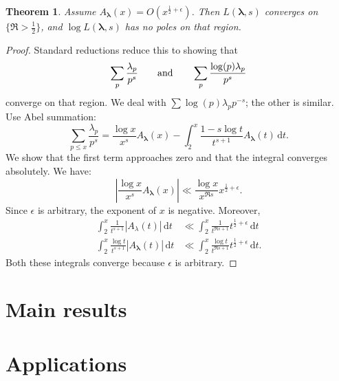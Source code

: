 \documentclass{article}
\newcommand{\blambda}{{\boldsymbol{\lambda}}}
\newcommand{\dd}{\mathrm{d}}
\newtheorem{theorem}[subsection]{Theorem}
\theoremstyle{definition}
\begin{document}
\begin{theorem}
Assume $A_\blambda(x) = O(x^{\frac 1 2 +\epsilon})$. Then $L(\blambda,s)$ 
converges on $\{\Re>\frac 1 2\}$, and $\log L(\blambda,s)$ has no poles on that 
region. 
\end{theorem}
\begin{proof}
Standard reductions reduce this to showing that 
\[
	\sum_p \frac{\lambda_p}{p^s} \qquad \textnormal{and}\qquad \sum_p \frac{\log(p) \lambda_p}{p^s} 
\]
converge on that region. We deal with $\sum \log(p)\lambda_p p^{-s}$; the 
other is similar. Use Abel summation:
\[
	\sum_{p\leqslant x} \frac{\lambda_p}{p^s}
		= \frac{\log x}{x^s} A_\blambda(x) - \int_2^x \frac{1-s\log t}{t^{s+1}} A_\blambda(t)\, \dd t .
\]
We show that the first term approaches zero and that the integral converges 
absolutely. We have: 
\[
	\left| \frac{\log x}{x^s} A_\blambda(x)\right| \ll \frac{\log x}{x^{\Re s}} x^{\frac 1 2+\epsilon}  .
\]
Since $\epsilon$ is arbitrary, the exponent of $x$ is negative. Moreover, 
\begin{align*}
	\int_2^x \frac{1}{t^{s+1}} | A_\lambda(t)|\, \dd t
		& \ll \int_2^x \frac{1}{t^{\Re s+1}} t^{\frac 1 2+\epsilon} \, \dd t \\
	\int_2^x \frac{\log t}{t^{s+1}} |A_\blambda(t)|\, \dd t
		& \ll \int_2^x \frac{\log t}{t^{\Re s+1}} t^{\frac 1 2+\epsilon}\, \dd t .
\end{align*}
Both these integrals converge because $\epsilon$ is arbitrary. 
\end{proof}





\section{Main results}\label{sec:main-result}





\section{Applications}\label{sec:application}





\printbibliography
\end{document}
